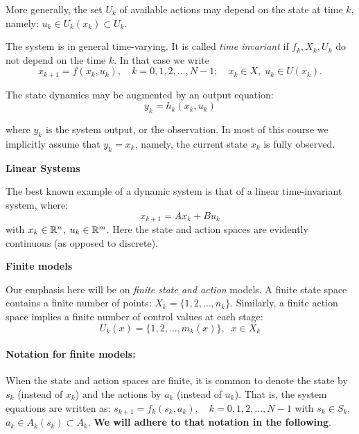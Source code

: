 \begin{remark}
 	More generally, the set $U_k$ of available actions may depend on the state at time $k$, namely: ${u_k} \in {U_k}({x_k}) \subset {U_k}$.
\end{remark}
\begin{remark}
 	The system is in general time-varying. It is called \emph{time invariant} if ${f_k},{X_k},{U_k}$ do not depend on the time $k$. In that case we write
\[{x_{k + 1}} = f({x_k},{u_k}),\quad k = 0,1,2, \ldots ,N - 1;\quad {x_k} \in X,\;{u_k} \in U({x_k}).\]
\end{remark}
\begin{remark}
 	The state dynamics may be augmented by an output equation:
\[{y_k} = {h_k}({x_k},{u_k})\]
\end{remark}
where  $y_k$ is the system output, or the observation. In most of this course we  implicitly assume that $y_k=x_k$, namely, the current state $x_k$ is fully observed.

\begin{example}{\textbf{Linear Systems}}

The best known example of a dynamic system is that of a linear time-invariant system, where:
\[{x_{k + 1}} = A{x_k} + B{u_k}\]
with ${x_k} \in \mathbb{R}^n$, $u_k \in \mathbb{R}^m$. Here the state and action spaces are evidently continuous (as opposed to discrete).
\end{example}

\begin{example}{\textbf{Finite models}}

Our emphasis here will be on \emph{finite state and action} models. A finite state space contains a finite number of points: ${X_k} = \{ 1,2, \ldots ,{n_k}\} $. Similarly, a finite action space implies a finite number of control values at each stage:
\[{U_k}(x) = \{ 1,2, \ldots ,{m_k}(x)\} ,\;\;x \in {X_k}\]
\end{example}

\paragraph{Notation for finite models:}  When the state and action spaces are finite, it is common to denote the state by ${s_k}$ (instead of ${x_k}$) and the actions by ${a_k}$ (instead of ${u_k}$). That is, the system equations are written as:
${s_{k + 1}} = {f_k}({s_k},{a_k}),\quad k = 0,1,2, \ldots ,N - 1$
with ${s_k} \in {S_k}$, ${a_k} \in {A_k}({s_k}) \subset {A_k}$.  \textbf{We will adhere to that notation in the following}.


